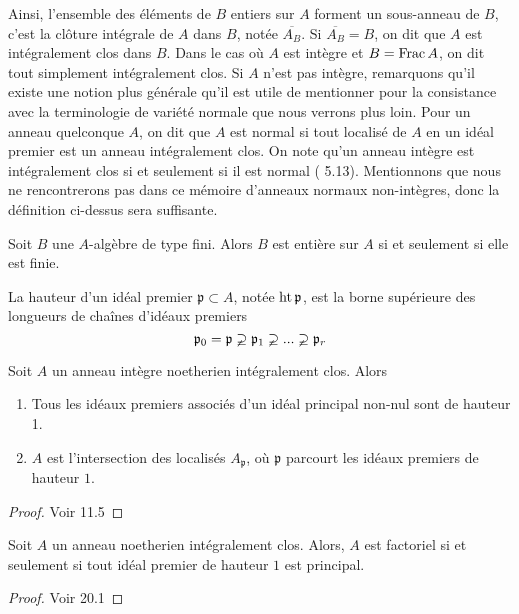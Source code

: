 Ainsi, l'ensemble des éléments de $B$ entiers sur $A$ forment un sous-anneau de $B$, c'est la clôture intégrale de $A$ dans $B$, notée $\overline{A_B}$. Si $\overline{A_B}=B$, on dit que $A$ est intégralement clos dans $B$. Dans le cas où $A$ est intègre et $B=\operatorname{Frac} A$, on dit tout simplement intégralement clos. Si $A$ n'est pas intègre, remarquons qu'il existe une notion plus générale qu'il est utile de mentionner pour la consistance avec la terminologie de variété normale que nous verrons plus loin. Pour un anneau quelconque $A$, on dit que $A$ est normal si tout localisé de $A$ en un idéal premier est un anneau intégralement clos. On note qu'un anneau intègre est intégralement clos si et seulement si il est normal (\cite{atiyahmacdo} 5.13). Mentionnons que nous ne rencontrerons pas dans ce mémoire d'anneaux normaux non-intègres, donc la définition ci-dessus sera suffisante.

\begin{cor}
Soit $B$ une $A$-algèbre de type fini. Alors $B$ est entière sur $A$ si et seulement si elle est finie.
\end{cor}

\begin{defn}
La hauteur d'un idéal premier $\mathfrak{p}\subset A$, notée $\operatorname{ht} \mathfrak{p}$, est la borne supérieure des longueurs de chaînes d'idéaux premiers
$$\mathfrak{p}_0=\mathfrak{p}\varsupsetneq \mathfrak{p}_1 \varsupsetneq...\varsupsetneq  \mathfrak{p}_r$$
\end{defn}


\begin{thm}\label{factonormal}
Soit $A$ un anneau intègre noetherien intégralement clos. Alors
\begin{enumerate}
\item Tous les idéaux premiers associés d'un idéal principal non-nul sont de hauteur 1.
\item $A$ est l'intersection des localisés $A_\mathfrak{p}$, où $\mathfrak{p}$ parcourt les idéaux premiers de hauteur $1$.
\end{enumerate}
\end{thm}
\begin{proof}
Voir \cite{Matsumura} 11.5
\end{proof}


\begin{thm}\label{UFDPID}
Soit $A$ un anneau noetherien intégralement clos. Alors,
$A$ est factoriel si et seulement si tout idéal premier de hauteur $1$ est principal.
\end{thm}
\begin{proof}
Voir \cite{Matsumura} 20.1
\end{proof}

